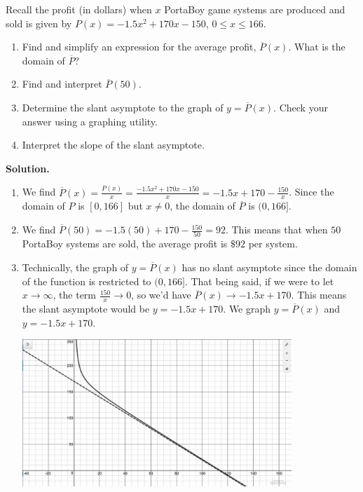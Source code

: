 \begin{ex} \label{PortaBoyAverageProfit}  Recall the profit (in dollars) when $x$ PortaBoy game systems are produced and sold is given by $P(x) =  -1.5x^2+170x-150$, $0 \leq x \leq 166$.

\begin{enumerate}

\item  Find and simplify an expression for the average profit, $\overline{P}(x)$.  What is the domain of $\overline{P}$?

\item Find and interpret $\overline{P}(50)$.

\item Determine the slant asymptote to the graph of $y = \overline{P}(x)$.  Check your answer using a graphing utility.

\item  Interpret the slope of the slant asymptote.


\end{enumerate}

{\bf Solution.}

\begin{enumerate}

\item  We find $\overline{P}(x)  = \frac{P(x)}{x} = \frac{ -1.5x^2+170x-150}{x} = -1.5x + 170 - \frac{150}{x}$.  Since the domain of $P$ is $[0, 166]$ but $x \neq 0$, the domain of $\overline{P}$ is $(0, 166]$.

\item  We find $\overline{P}(50) = -1.5(50)+170 - \frac{150}{50} = 92$.  This means that when $50$ PortaBoy systems are sold, the average profit is $\$ 92$ per system.

\item  Technically, the graph of $y = \overline{P}(x)$ has no slant asymptote since the domain of the function is restricted to $(0, 166]$.  That being said, if we were to let $x \rightarrow \infty$, the term $\frac{150}{x} \rightarrow 0$, so we'd  have $\overline{P}(x)  \rightarrow -1.5x + 170$.  This means the slant asymptote would be $y = -1.5x + 170$.  We graph $y = \overline{P}(x)$ and $y = -1.5x+170$.

  
\begin{center}
   
\includegraphics[width=4in]{./IntroRationalGraphics/SAEx06.jpg}


\end{center}
\end{enumerate}
\end{ex}
